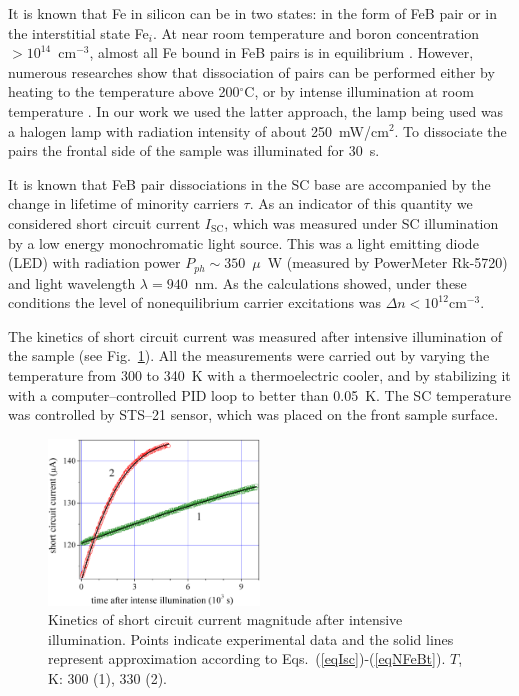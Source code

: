 \documentclass[sn-mathphys]{sn-jnl}%
\theoremstyle{thmstyleone}%
\theoremstyle{thmstyletwo}%
\theoremstyle{thmstylethree}%
\begin{document}
It is known that Fe in silicon can be in two states:
in the form of FeB pair or in the interstitial state Fe$_i$.
At near room temperature and boron concentration $>10^{14}$~cm$^{-3}$,
almost all Fe bound in FeB pairs is in equilibrium \cite{FeB:kinetic,FeBAssJAP2014,FeBAssSST2011,FeBJAP2005}.
However, numerous researches show that dissociation of pairs can be performed either by heating to the temperature above 200$^\circ$C,
or by intense illumination at room temperature \cite{FeBAssJAP2014,FeBJAP2005}.
In our work we used the latter approach, the lamp being used was a halogen lamp with radiation intensity of about 250~mW/cm$^2$.
To dissociate the pairs the frontal side of the sample was illuminated for 30~s.

It is known that FeB pair dissociations in the SC base are accompanied by the change
in lifetime of minority carriers $\tau$.
As an indicator of this quantity we considered short circuit current $I_\mathrm{SC}$,
which was measured under SC illumination by a low energy monochromatic light source.
This was a light emitting diode (LED) with radiation power $P_{ph}\sim350$~$\mu$~W
(measured by PowerMeter Rk-5720) and light wavelength $\lambda=940$~nm.
As the calculations showed, under these conditions the level of nonequilibrium carrier
excitations was $\Delta n<10^{12}$cm$^{-3}$.

The kinetics of short circuit current was measured after intensive illumination of the sample
(see Fig.~\ref{figIsc}).
All the measurements were carried out by varying the temperature from 300 to 340~K with a thermoelectric cooler,
and by stabilizing it with a computer--controlled PID loop to better than 0.05~K.
The SC temperature was controlled by STS--21 sensor, which was placed on the front sample surface.

\begin{figure}
\centering
\includegraphics[width=0.5\textwidth]{Fig2}
\caption{Kinetics of short circuit current magnitude after intensive illumination.
Points indicate experimental data and the solid lines represent approximation
according to Eqs.~(\ref{eqIsc})-(\ref{eqNFeBt}).
$T$, K: 300 (1), 330 (2).}
\label{figIsc}       %
\end{figure}
\end{document}

